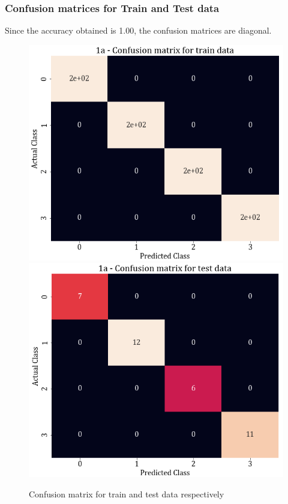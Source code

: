 \documentclass[11pt,a4paper]{article}
\newcommand{\noi}{\noindent}
\begin{document}
\subsubsection{Confusion matrices for Train and Test data}
Since the accuracy obtained is 1.00, the confusion matrices are diagonal. 
\begin{figure}[H]
    \includegraphics[scale=0.4]{images/1A_confmatrix_train.png}
    \includegraphics[scale=0.4]{images/1A_confmatrix_test.png}
    \caption{Confusion matrix for train and test data respectively}
\end{figure}
\noi 
\end{document}
